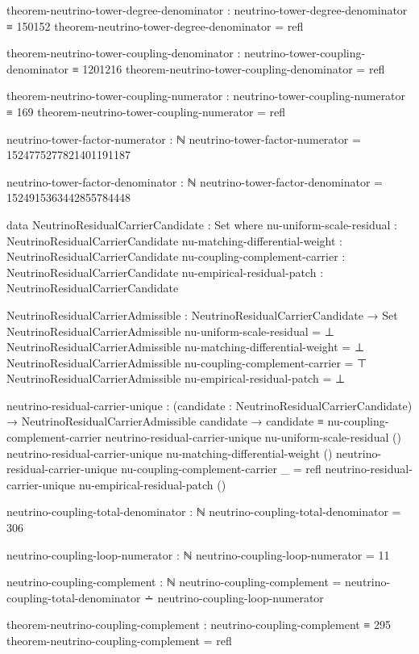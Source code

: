 \documentclass[11pt,a4paper]{book}
\begin{document}
\begin{code}
theorem-neutrino-tower-degree-denominator :
  neutrino-tower-degree-denominator ≡ 150152
theorem-neutrino-tower-degree-denominator = refl

theorem-neutrino-tower-coupling-denominator :
  neutrino-tower-coupling-denominator ≡ 1201216
theorem-neutrino-tower-coupling-denominator = refl

theorem-neutrino-tower-coupling-numerator :
  neutrino-tower-coupling-numerator ≡ 169
theorem-neutrino-tower-coupling-numerator = refl

neutrino-tower-factor-numerator : ℕ
neutrino-tower-factor-numerator = 1524775277821401191187

neutrino-tower-factor-denominator : ℕ
neutrino-tower-factor-denominator = 1524915363442855784448

data NeutrinoResidualCarrierCandidate : Set where
  nu-uniform-scale-residual       : NeutrinoResidualCarrierCandidate
  nu-matching-differential-weight : NeutrinoResidualCarrierCandidate
  nu-coupling-complement-carrier  : NeutrinoResidualCarrierCandidate
  nu-empirical-residual-patch     : NeutrinoResidualCarrierCandidate

NeutrinoResidualCarrierAdmissible : NeutrinoResidualCarrierCandidate → Set
NeutrinoResidualCarrierAdmissible nu-uniform-scale-residual = ⊥
NeutrinoResidualCarrierAdmissible nu-matching-differential-weight = ⊥
NeutrinoResidualCarrierAdmissible nu-coupling-complement-carrier = ⊤
NeutrinoResidualCarrierAdmissible nu-empirical-residual-patch = ⊥

neutrino-residual-carrier-unique :
  (candidate : NeutrinoResidualCarrierCandidate) →
  NeutrinoResidualCarrierAdmissible candidate →
  candidate ≡ nu-coupling-complement-carrier
neutrino-residual-carrier-unique nu-uniform-scale-residual ()
neutrino-residual-carrier-unique nu-matching-differential-weight ()
neutrino-residual-carrier-unique nu-coupling-complement-carrier _ = refl
neutrino-residual-carrier-unique nu-empirical-residual-patch ()

neutrino-coupling-total-denominator : ℕ
neutrino-coupling-total-denominator = 306

neutrino-coupling-loop-numerator : ℕ
neutrino-coupling-loop-numerator = 11

neutrino-coupling-complement : ℕ
neutrino-coupling-complement =
  neutrino-coupling-total-denominator ∸ neutrino-coupling-loop-numerator

theorem-neutrino-coupling-complement :
  neutrino-coupling-complement ≡ 295
theorem-neutrino-coupling-complement = refl


\end{code}
\end{document}
